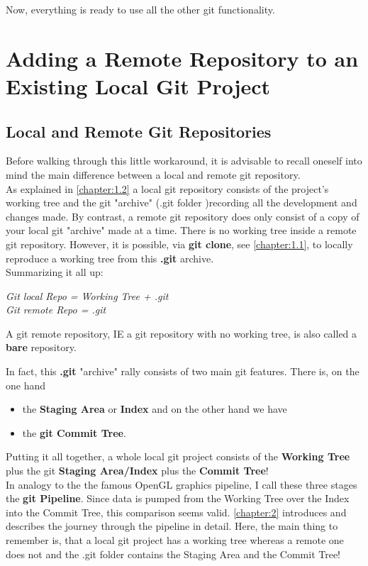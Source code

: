 Now, everything is ready to use all the other git functionality.



\section{Adding a Remote Repository to an Existing Local Git Project}
\label{chapter:1.3}



\subsection{Local and Remote Git Repositories}
\label{chapter:1.3.1}
Before walking through this little workaround, it is advisable to recall oneself into mind the main difference between a local and remote git 
repository.
\\ 
As explained in \cref{chapter:1.2} a local git repository consists of the project's working tree and the git "archive" (.git folder )recording all the development  and 
changes made. By contrast, a remote git repository does only consist of a copy of your local git "archive" made at a time. There is no working tree inside a remote 
git repository. However, it is possible, via \textbf{git clone}, see \cref{chapter:1.1}, to locally reproduce a working tree from this \textbf{.git} archive.
\\
Summarizing it all up:

\textit{
	\hspace*{1cm} Git local Repo \hspace*{0.25cm} = Working Tree + .git  \\
	\hspace*{1.1cm} Git remote Repo = .git
}

A git remote repository, \ac{IE} a git repository with no working tree, is also called a \textbf{bare} repository.



In fact, this \textbf{.git} "archive" rally consists of two main git features. There is, on the one hand 
\begin{itemize}
	\item the \textbf{Staging Area} or \textbf{Index} and on the other hand we have 
	\item the \textbf{git Commit Tree}.
\end{itemize}
Putting it all together, a whole local git project consists of the \textbf{Working Tree} plus the git \textbf{Staging Area/Index} plus the 
\textbf{Commit Tree}!
\\
In analogy to the the famous OpenGL graphics pipeline, I call these three stages the \textbf{git Pipeline}. Since data is pumped from the Working Tree over the Index
into the Commit Tree, this comparison seems valid. \cref{chapter:2} introduces and describes the journey through the pipeline in detail. Here, the main thing to remember is, 
that a local git project has a working tree whereas a remote one does not and the .git folder contains the Staging Area and the Commit Tree!


